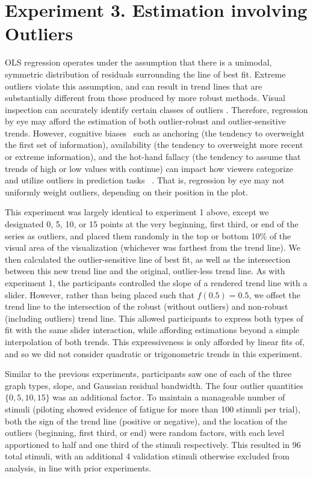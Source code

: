 \documentclass{sigchi}
\begin{document}
\section{Experiment 3. Estimation involving Outliers}

\outlierFig
OLS regression operates under the assumption that there is a unimodal, symmetric distribution of residuals surrounding the line of best fit. Extreme outliers violate this assumption, and can result in trend lines that are substantially different from those produced by more robust methods. Visual inspection can accurately identify certain classes of outliers \cite{albers2014task}. Therefore, regression by eye may afford the estimation of both outlier-robust and outlier-sensitive trends. However, cognitive biases~\cite{tversky1975judgment} such as anchoring (the tendency to overweight the first set of information), availability (the tendency to overweight more recent or extreme information), and the hot-hand fallacy (the tendency to assume that trends of high or low values with continue) can impact how viewers categorize and utilize outliers in prediction tasks ~\cite{campbell2009anchoring, ji2001culture}. That is, regression by eye may not uniformly weight outliers, depending on their position in the plot.

This experiment was largely identical to experiment 1 above, except we designated 0, 5, 10, or 15 points at the very beginning, first third, or end of the series as outliers, and placed them randomly in the top or bottom 10\% of the visual area of the visualization (whichever was farthest from the trend line). We then calculated the outlier-sensitive line of best fit, as well as the intersection between this new trend line and the original, outlier-less trend line. As with experiment 1, the participants controlled the slope of a rendered trend line with a slider. However, rather than being placed such that $f(0.5)=0.5$, we offset the trend line to the intersection of the robust (without outliers) and non-robust (including outliers) trend line. This allowed participants to express both types of fit with the same slider interaction, while affording estimations beyond a simple interpolation of both trends. This expressiveness is only afforded by linear fits of, and so we did not consider quadratic or trigonometric trends in this experiment.

Similar to the previous experiments, participants saw one of each of the three graph types, slope, and Gaussian residual bandwidth. The four outlier quantities $\{0,5,10,15\}$ was an additional factor. To maintain a manageable number of stimuli (piloting showed evidence of fatigue for more than 100 stimuli per trial), both the sign of the trend line (positive or negative), and the location of the outliers (beginning, first third, or end) were random factors, with each level apportioned to half and one third of the stimuli respectively. This resulted in 96 total stimuli, with an additional 4 validation stimuli otherwise excluded from analysis, in line with prior experiments.
\end{document}
